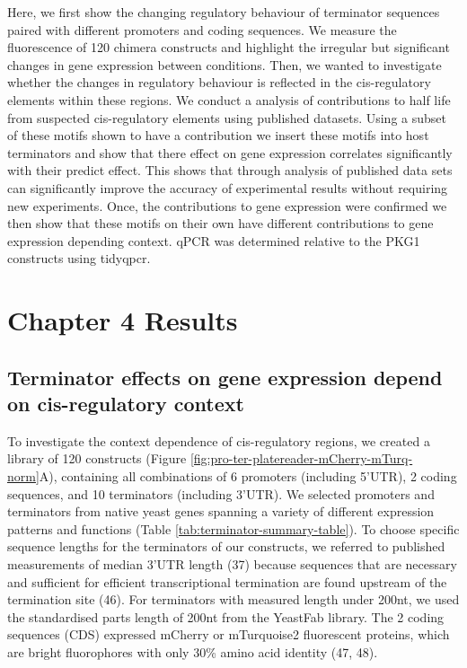 \documentclass{SBCbookchapter}
\begin{document}
Here, we first show the changing regulatory behaviour of terminator sequences paired with different promoters and coding sequences. We measure the fluorescence of 120 chimera constructs and highlight the irregular but significant changes in gene expression between conditions. Then, we wanted to investigate whether the changes in regulatory behaviour is reflected in the cis-regulatory elements within these regions. We conduct a analysis of contributions to half life from suspected cis-regulatory elements using published datasets. Using a subset of these motifs shown to have a contribution we insert these motifs into host terminators and show that there effect on gene expression correlates significantly with their predict effect. This shows that through analysis of published data sets can significantly improve the accuracy of experimental results without requiring new experiments. Once, the contributions to gene expression were confirmed we then show that these motifs on their own have different contributions to gene expression depending context. qPCR was determined relative to the PKG1 constructs using tidyqpcr.
 
\section{Chapter 4 Results}

\subsection{Terminator effects on gene expression depend on cis-regulatory context}

To investigate the context dependence of cis-regulatory regions, we created a library of 120 constructs (Figure \ref{fig:pro-ter-platereader-mCherry-mTurq-norm}A), containing all combinations of 6 promoters (including 5'UTR), 2 coding sequences, and 10 terminators (including 3'UTR).
We selected promoters and terminators from native yeast genes spanning a variety of different expression patterns and functions (Table \ref{tab:terminator-summary-table}).
To choose specific sequence lengths for the terminators of our constructs, we referred to published measurements of median 3'UTR length (37) because sequences that are necessary and sufficient for efficient transcriptional termination are found upstream of the termination site (46).
For terminators with measured length under 200nt, we used the standardised parts length of 200nt from the YeastFab library.
The 2 coding sequences (CDS) expressed mCherry or mTurquoise2 fluorescent proteins, which are bright fluorophores with only 30\% amino acid identity (47, 48).
\end{document}

